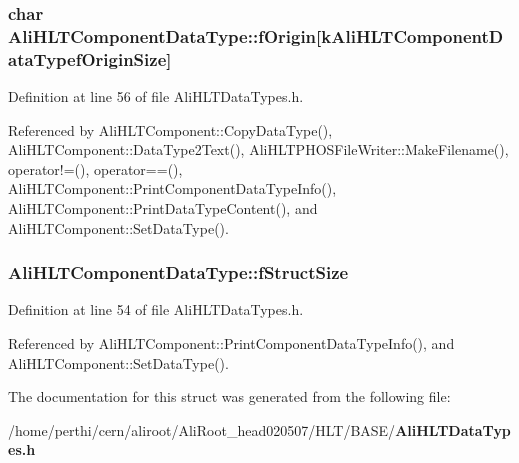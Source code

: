 \subsubsection{\setlength{\rightskip}{0pt plus 5cm}char {\bf Ali\-HLTComponent\-Data\-Type::f\-Origin}[{\bf k\-Ali\-HLTComponent\-Data\-Typef\-Origin\-Size}]}\label{structAliHLTComponentDataType_o2}




Definition at line 56 of file Ali\-HLTData\-Types.h.

Referenced by Ali\-HLTComponent::Copy\-Data\-Type(), Ali\-HLTComponent::Data\-Type2Text(), Ali\-HLTPHOSFile\-Writer::Make\-Filename(), operator!=(), operator==(), Ali\-HLTComponent::Print\-Component\-Data\-Type\-Info(), Ali\-HLTComponent::Print\-Data\-Type\-Content(), and Ali\-HLTComponent::Set\-Data\-Type().
\subsubsection{ {\bf Ali\-HLTComponent\-Data\-Type::f\-Struct\-Size}}\label{structAliHLTComponentDataType_o0}




Definition at line 54 of file Ali\-HLTData\-Types.h.

Referenced by Ali\-HLTComponent::Print\-Component\-Data\-Type\-Info(), and Ali\-HLTComponent::Set\-Data\-Type().

The documentation for this struct was generated from the following file:\begin{CompactItemize}
\item 
/home/perthi/cern/aliroot/Ali\-Root\_\-head020507/HLT/BASE/{\bf Ali\-HLTData\-Types.h}\end{CompactItemize}
